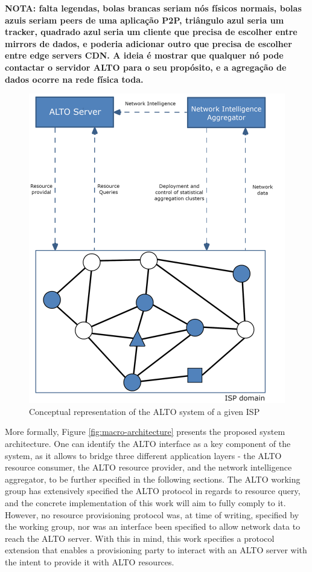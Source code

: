 \documentclass[
  oneside,
  11pt, a4paper,
  footinclude=true,
  headinclude=true,
  cleardoublepage=empty
]{scrbook}
\begin{document}
	\textbf{NOTA: falta legendas, bolas brancas seriam nós físicos normais, bolas azuis seriam peers de uma aplicação P2P, triângulo azul seria um tracker, quadrado azul seria um cliente que precisa de escolher entre mirrors de dados, e poderia adicionar outro que precisa de escolher entre edge servers CDN. A ideia é mostrar que qualquer nó pode contactar o servidor ALTO para o seu propósito, e a agregação de dados ocorre na rede física toda.}
	
	\begin{figure}[!h]
    \centering
    \includegraphics[scale=0.75]{img/architecture-network.png}
    \caption{Conceptual representation of the ALTO system of a given ISP}
    \label{fig:architecture-network}
    \end{figure}
	
	More formally, Figure \ref{fig:macro-architecture} presents the proposed system architecture. One can identify the ALTO interface as a key component of the system, as it allows to bridge three different application layers - the ALTO resource consumer, the ALTO resource provider, and the network intelligence aggregator, to be further specified in the following sections. The ALTO working group has extensively specified the ALTO protocol in regards to resource query, and the concrete implementation of this work will aim to fully comply to it. However, no resource provisioning protocol was, at time of writing, specified by the working group, nor was an interface been specified to allow network data to reach the ALTO server. With this in mind, this work specifies a protocol extension that enables a provisioning party to interact with an ALTO server with the intent to provide it with ALTO resources. 
	
\end{document}
